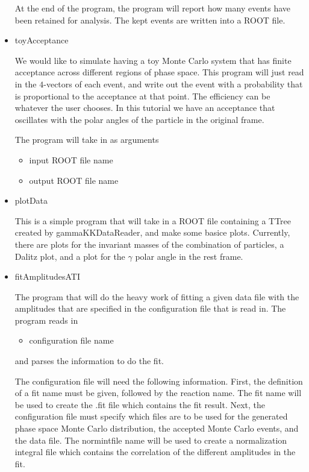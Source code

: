 \documentclass[11pt]{article}
\begin{document}
\begin{itemize}
    At the end of the program, the program will report how many events
    have been retained for analysis. The kept events are written into
    a ROOT file.

  \item toyAcceptance

    We would like to simulate having a toy Monte Carlo system that
    has finite acceptance across different regions of phase
    space. This program will just read in the $4$-vectors of each
    event, and write out the event with a probability that is
    proportional to the acceptance at that point. The efficiency can
    be whatever the user chooses. In this tutorial we have an
    acceptance that oscillates with the polar angles of the particle
    in the original frame.

    The program will take in as arguments
    \begin{itemize}
      \item input ROOT file name
      \item output ROOT file name
    \end{itemize}

  \item plotData

    This is a simple program that will take in a ROOT file containing
    a TTree created by gammaKKDataReader, and make some basice
    plots. Currently, there are plots for the invariant masses of the
    combination of particles, a Dalitz plot, and a plot for the
    $\gamma$ polar angle in the rest frame.

  \item fitAmplitudesATI

    The program that will do the heavy work of fitting a given data
    file with the amplitudes that are specified in the configuration
    file that is read in. The program reads in
    \begin{itemize}
      \item configuration file name
    \end{itemize}
    and parses the information to do the fit.

    The configuration file will need the following information. First,
    the definition of a fit name must be given, followed by the
    reaction name. The fit name will be used to create the .fit file
    which contains the fit result. Next, the configuration file must
    specify which files are to be used for the generated phase space
    Monte Carlo distribution, the accepted Monte Carlo events, and the
    data file. The normintfile name will be used to create a
    normalization integral file which contains the correlation of the
    different amplitudes in the fit.


\end{itemize}
\end{document}
